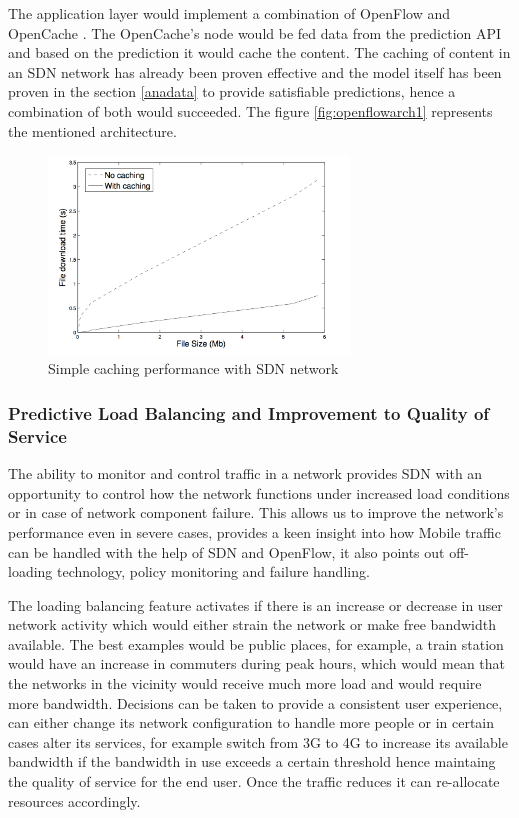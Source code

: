 \documentclass[prodmode,acmtecs]{acmsmall}
\begin{document}
The application layer would implement a combination of OpenFlow and OpenCache \cite{broadbent2012opencache}. The OpenCache's node would be fed data from the prediction API and based on the prediction it would cache the content. The caching of content in an SDN network has already been proven effective \cite{chanda2013content} and the model itself has been proven in the section \ref{anadata} to provide satisfiable predictions, hence a combination of both would succeeded. The figure \ref{fig:openflowarch1} represents the mentioned architecture.

\begin{figure}[bhtp]
 \centering
 \includegraphics[width=80mm]{prediction_caching.png}
  \caption {Simple caching performance with SDN network \cite{chanda2013content}}
 \label{fig:openflowarch1predcaching}
\end{figure}


\subsubsection{Predictive Load Balancing and Improvement to Quality of Service}

The ability to monitor and control traffic in a network provides SDN with an opportunity to control how the network functions under increased load conditions or in case of network component failure. This allows us to improve the network's performance even in severe cases,  \cite{openflow2013} provides a keen insight into how Mobile traffic can be handled with the help of SDN and OpenFlow, it also points out off-loading technology, policy monitoring and failure handling.

The loading balancing feature activates if there is an increase or decrease in user network activity which would either strain the network or make free bandwidth available. The best examples would be public places, for example, a train station would have an increase in commuters during peak hours, which would mean that the networks in the vicinity would receive much more load and would require more bandwidth. Decisions can be taken to provide a consistent user experience, can either change its network configuration to handle more people or in certain cases alter its services, for example switch from 3G to 4G to increase its available bandwidth if the bandwidth in use exceeds a certain threshold hence maintaing the quality of service for the end user. Once the traffic reduces it can re-allocate resources accordingly.
\end{document}
